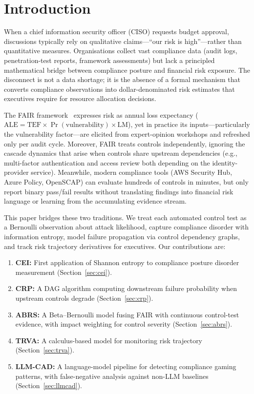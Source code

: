 \documentclass[conference]{IEEEtran}
\newcommand{\ALE}{\mathrm{ALE}}
\newcommand{\TEF}{\mathrm{TEF}}
\newcommand{\LM}{\mathrm{LM}}
\begin{document}
\section{Introduction}
When a chief information security officer (CISO) requests budget approval, discussions typically rely on qualitative claims---``our risk is high''---rather than quantitative measures. Organisations collect vast compliance data (audit logs, penetration-test reports, framework assessments) but lack a principled mathematical bridge between compliance posture and financial risk exposure. The disconnect is not a data shortage; it is the absence of a formal mechanism that converts compliance observations into dollar-denominated risk estimates that executives require for resource allocation decisions.

The FAIR framework~\cite{Jones2005} expresses risk as annual loss expectancy ($\ALE = \TEF \times \Pr(\text{vulnerability}) \times \LM$), yet in practice its inputs---particularly the vulnerability factor---are elicited from expert-opinion workshops and refreshed only per audit cycle. Moreover, FAIR treats controls independently, ignoring the cascade dynamics that arise when controls share upstream dependencies (e.g., multi-factor authentication and access review both depending on the identity-provider service). Meanwhile, modern compliance tools (AWS Security Hub, Azure Policy, OpenSCAP) can evaluate hundreds of controls in minutes, but only report binary pass/fail results without translating findings into financial risk language or learning from the accumulating evidence stream.

This paper bridges these two traditions. We treat each automated control test as a Bernoulli observation about attack likelihood, capture compliance disorder with information entropy, model failure propagation via control dependency graphs, and track risk trajectory derivatives for executives. Our contributions are:
\begin{enumerate}
  \item \textbf{CEI:} First application of Shannon entropy to compliance posture disorder measurement (Section~\ref{sec:cei}).
  \item \textbf{CRP:} A DAG algorithm computing downstream failure probability when upstream controls degrade (Section~\ref{sec:crp}).
  \item \textbf{ABRS:} A Beta--Bernoulli model fusing FAIR with continuous control-test evidence, with impact weighting for control severity (Section~\ref{sec:abrs}).
  \item \textbf{TRVA:} A calculus-based model for monitoring risk trajectory (Section~\ref{sec:trva}).
  \item \textbf{LLM-CAD:} A language-model pipeline for detecting compliance gaming patterns, with false-negative analysis against non-LLM baselines (Section~\ref{sec:llmcad}).
\end{enumerate}
\end{document}
